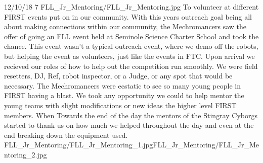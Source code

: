 {12/10/18}
{7}
{FLL_Jr_Mentoring/FLL_Jr_Mentoring.jpg}
{To volunteer at different FIRST events put on in our community.} 
{
	With this years outreach goal being all about making connections within our community, the Mechromancers saw the offer of going 
an FLL event held at Seminole Science Charter School and took the chance. This event wasn't a typical outreach event, where we demo off the robots, but helping the event as volunteers, just like the events in FTC. Upon arrival we recieved our roles of how to help out the competition run smoothly. We were field resetters, DJ, Ref, robot inspector, or a Judge, or any spot that would be necessary. The Mechromancers were ecstatic to see so many young people in FIRST having a blast. We took any opportunity we could to help mentor the young teams with slight modifications or new ideas the higher level FIRST members. When Towards the end of the day the mentors of the Stingray Cyborgs started to thank us on how much we helped throughout the day and even at the end breaking down the equipment used.  
} 
{FLL_Jr_Mentoring/FLL_Jr_Mentoring_1.jpg}{FLL_Jr_Mentoring/FLL_Jr_Mentoring_2.jpg}
